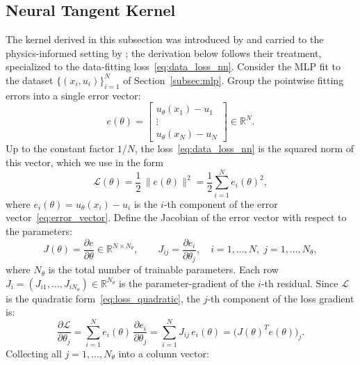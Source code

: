 \subsection{Neural Tangent Kernel}
\label{subsec:ntk}

The kernel derived in this subsection was introduced by \textcite{jacot2018} and carried to the physics-informed setting by \textcite{wang2022ntk}; the derivation below follows their treatment, specialized to the data-fitting loss~\eqref{eq:data_loss_nn}. Consider the MLP fit to the dataset $\{(x_i,u_i)\}_{i=1}^{N}$ of Section~\ref{subsec:mlp}. Group the pointwise fitting errors into a single error vector:
\begin{equation}\label{eq:error_vector}
    e(\theta) =
    \begin{bmatrix}
        u_\theta(x_1) - u_1 \\
        \vdots \\
        u_\theta(x_{N}) - u_{N}
    \end{bmatrix}
    \in \mathbb{R}^{N}.
\end{equation}
Up to the constant factor $1/N$, the loss~\eqref{eq:data_loss_nn} is the squared norm of this vector, which we use in the form
\begin{equation}\label{eq:loss_quadratic}
    \mathcal{L}(\theta) = \frac{1}{2}\,\|e(\theta)\|^2 = \frac{1}{2}\sum_{i=1}^{N} e_i(\theta)^2,
\end{equation}
where $e_i(\theta) = u_\theta(x_i) - u_i$ is the $i$-th component of the error vector~\eqref{eq:error_vector}.
Define the Jacobian of the error vector with respect to the parameters:
\begin{equation*}
    J(\theta) = \frac{\partial e}{\partial\theta} \in \mathbb{R}^{N \times N_\theta},
    \qquad J_{ij} = \frac{\partial e_i}{\partial\theta_j},\quad i = 1,\ldots,N,\; j = 1,\ldots,N_\theta,
\end{equation*}
where $N_\theta$ is the total number of trainable parameters. Each row $J_i = (J_{i1},\ldots,J_{iN_\theta}) \in \mathbb{R}^{N_\theta}$ is the parameter-gradient of the $i$-th residual. Since $\mathcal{L}$ is the quadratic form~\eqref{eq:loss_quadratic}, the $j$-th component of the loss gradient is:
\begin{equation*}
    \frac{\partial \mathcal{L}}{\partial \theta_j}
    = \sum_{i=1}^{N} e_i(\theta)\,\frac{\partial e_i}{\partial \theta_j}
    = \sum_{i=1}^{N} J_{ij}\,e_i(\theta)
    = \bigl(J(\theta)^T e(\theta)\bigr)_j.
\end{equation*}
Collecting all $j = 1,\ldots,N_\theta$ into a column vector:
